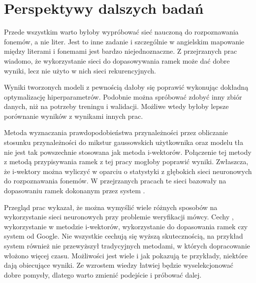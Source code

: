 \section{Perspektywy dalszych badań}

Przede wszystkim warto byłoby wypróbować sieć nauczoną do rozpoznawania fonemów, a nie liter.
Jest to inne zadanie i szczególnie w angielskim mapowanie między literami i fonemami
jest bardzo niejednoznaczne. Z przejrzanych prac wiadomo, że wykorzystanie sieci
do dopasowywania ramek może dać dobre wyniki, lecz nie użyto w nich sieci rekurencyjnych.

Wyniki tworzonych modeli z pewnością dałoby się poprawić wykonując dokładną
optymalizację hiperparametrów. Podobnie można spróbować zdobyć inny zbiór danych,
niż  na potrzeby treningu i walidacji. Możliwe wtedy
byłoby lepsze porównanie wyników z wynikami innych prac.

Metoda wyznaczania prawdopodobieństwa przynależności przez obliczanie stosunku
przynależności do mikstur gaussowskich użytkownika oraz modelu tła nie jest
tak powszechnie stosowana jak metoda i-wektorów. Połączenie tej metody
z metodą przypisywania ramek z tej pracy mogłoby poprawić wyniki.
Zwłaszcza, że i-wektory można wyliczyć w oparciu o statystyki z głębokich sieci
neuronowych do rozpoznawania fonemów. W przejrzanych pracach te sieci bazowały
na dopasowaniu ramek dokonanym przez system .

Przegląd prac wykazał, że można wymyślić wiele różnych sposobów na wykorzystanie sieci neuronowych przy problemie
weryfikacji mówcy. Cechy , wykorzystanie  w metodzie i-wektorów,
wykorzystanie  do dopasowania ramek czy system  od Google.
Nie wszystkie cechują się wyższą skutecznością, na przykład system 
również nie przewyższył tradycyjnych metodami, w których dopracowanie włożono więcej czasu.
Możliwości jest wiele i jak pokazują te przykłady, niektóre dają obiecujące wyniki. Ze wzrostem wiedzy łatwiej
będzie wyselekcjonować dobre pomysły, dlatego warto zmienić podejście i próbować dalej.

